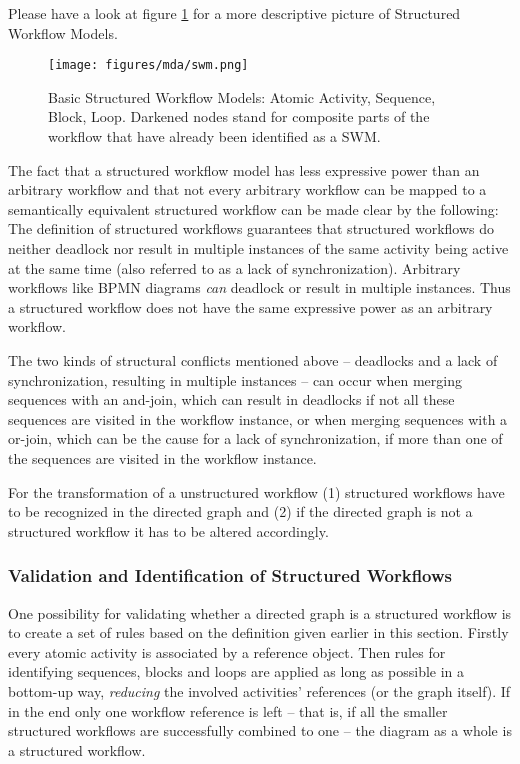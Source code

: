 Please have a look at figure \ref{fig:swm} for a more descriptive picture of Structured Workflow Models.

\begin{figure}[htp]
	\centering
	\texttt{[image: figures/mda/swm.png]}
	\caption[Basic Structured Workflow Models]{Basic Structured Workflow Models: Atomic Activity, Sequence, Block, Loop. Darkened nodes stand for composite parts of the workflow that have already been identified as a SWM.}
	\label{fig:swm}
\end{figure}

The fact that a structured workflow model has less expressive power than an arbitrary workflow and that not every arbitrary workflow can be mapped to a semantically equivalent structured workflow can be made clear by the following: The definition of structured workflows guarantees that structured workflows do neither deadlock nor result in multiple instances of the same activity being active at the same time (also referred to as a lack of synchronization). Arbitrary workflows like BPMN diagrams \emph{can} deadlock or result in multiple instances. Thus a structured workflow does not have the same expressive power as an arbitrary workflow.

The two kinds of structural conflicts mentioned above -- deadlocks and a lack of synchronization, resulting in multiple instances -- can occur when merging sequences with an and-join, which can result in deadlocks if not all these sequences are visited in the workflow instance, or when merging sequences with a or-join, which can be the cause for a lack of synchronization, if more than one of the sequences are visited in the workflow instance.

For the transformation of a unstructured workflow (1) structured workflows have to be recognized in the directed graph and (2) if the directed graph is not a structured workflow it has to be altered accordingly.


\subsubsection*{Validation and Identification of Structured Workflows}

One possibility for validating whether a directed graph is a structured workflow is to create a set of rules based on the definition given earlier in this section. Firstly every atomic activity is associated by a reference object. Then rules for identifying sequences, blocks and loops are applied as long as possible in a bottom-up way, \emph{reducing} the involved activities' references (or the graph itself). If in the end only one workflow reference is left -- that is, if all the smaller structured workflows are successfully combined to one -- the diagram as a whole is a structured workflow.

